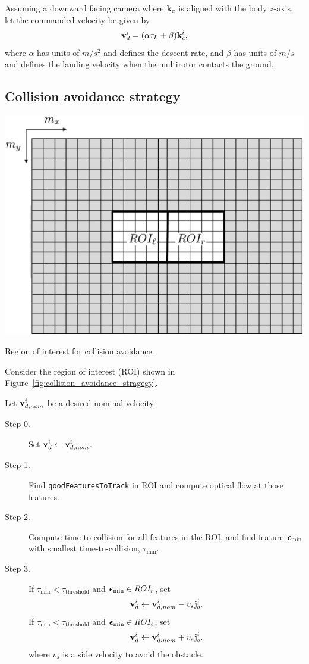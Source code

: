 Assuming a downward facing camera where $\mathbf{k}_c$ is aligned with the body $z$-axis, let the commanded velocity be given by
\[
\mathbf{v}_d^i = (\alpha \tau_L + \beta) \mathbf{k}_c^i,
\]
where $\alpha$ has units of $m/s^2$ and defines the descent rate, and $\beta$ has units of $m/s$ and defines the landing velocity when the multirotor contacts the ground.

\subsection{Collision avoidance strategy}


\begin{marginfigure}
	\includegraphics[width=\linewidth]{chap7_optical_flow/figures/collision_avoidance_strategy}
	\caption{Region of interest for collision avoidance.}
	\label{fig:collision_avoidance_stragegy}
\end{marginfigure}  

Consider the region of interest (ROI) shown in Figure~\ref{fig:collision_avoidance_stragegy}.

Let $\mathbf{v}_{d,nom}^i$ be a desired nominal velocity.

\begin{description}
	\item[Step 0.] Set $\mathbf{v}_d^i\leftarrow \mathbf{v}_{d,nom}^i$.
	\item[Step 1.] Find \texttt{goodFeaturesToTrack} in ROI and compute optical flow at those features.
	\item[Step 2.]  Compute time-to-collision for all features in the ROI, and find feature $\boldsymbol{\epsilon}_{\text{min}}$ with smallest time-to-collision, $\tau_{\text{min}}$.
	\item[Step 3.]
	If $\tau_{\text{min}}<\tau_{\text{threshold}}$ and  $\boldsymbol{\epsilon}_{\text{min}}\in ROI_r$, set
	\[
	\mathbf{v}_d^i \leftarrow \mathbf{v}_{d,nom}^i - v_s \mathbf{j}_b^i.
	\]
	If $\tau_{\text{min}}<\tau_{\text{threshold}}$ and  $\boldsymbol{\epsilon}_{\text{min}}\in ROI_\ell$, set
	\[
	\mathbf{v}_d^i \leftarrow \mathbf{v}_{d,nom}^i + v_s \mathbf{j}_b^i.
	\]
	where $v_s$ is a side velocity to avoid the obstacle.  
\end{description}

